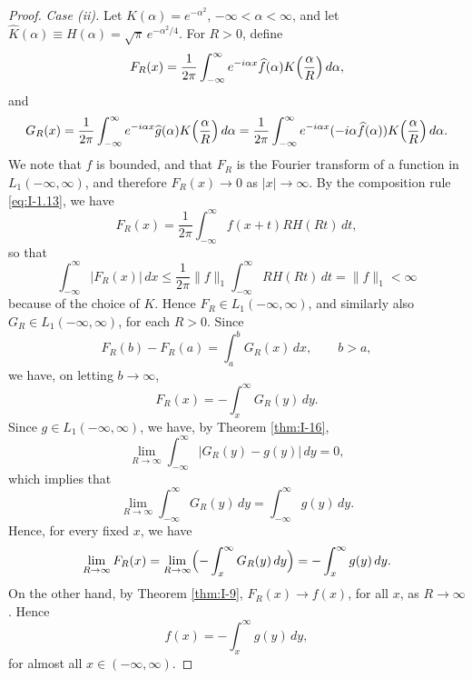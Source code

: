 \begin{proof}
\emph{Case (ii).} Let $K(\alpha)=e^{-\alpha^{2}}$, $-\infty<\alpha<\infty$, and let $\hat K(\alpha)\equiv H(\alpha)=\sqrt{\pi}\,e^{-\alpha^{2}/4}$. For $R>0$, define
\begin{equation*}
F_R(x)=\frac{1}{2\pi}\int_{-\infty}^{\infty}e^{-i\alpha x}\widehat f(\alpha)K\Bigl(\frac{\alpha}{R}\Bigr)\,d\alpha,
\end{equation*}
and
\begin{equation*}
G_R(x)=\frac{1}{2\pi}\int_{-\infty}^{\infty}e^{-i\alpha x}\widehat g(\alpha)K\Bigl(\frac{\alpha}{R}\Bigr)\,d\alpha
=\frac{1}{2\pi}\int_{-\infty}^{\infty}e^{-i\alpha x}(-i\alpha\widehat f(\alpha))K\Bigl(\frac{\alpha}{R}\Bigr)\,d\alpha.
\end{equation*}
We note that $\widehat f$ is bounded, and that $F_R$ is the Fourier transform of a function in $L_1(-\infty,\infty)$, and therefore $F_R(x)\to 0$ as $|x|\to\infty$. By the composition rule \eqref{eq:I-1.13}, we have
\begin{equation*}
F_R(x)=\frac{1}{2\pi}\int_{-\infty}^{\infty}f(x+t)RH(Rt)\,dt,
\end{equation*}
so that
\begin{equation}\label{eq:I-9.9}\tag{9.9}
\int_{-\infty}^{\infty}|F_R(x)|\,dx
\le\frac{1}{2\pi}\|f\|_1\int_{-\infty}^{\infty}RH(Rt)\,dt
=\|f\|_1<\infty
\end{equation}
because of the choice of $K$. Hence $F_R\in L_1(-\infty,\infty)$, and similarly also $G_R\in L_1(-\infty,\infty)$, for each $R>0$. Since
\begin{equation*}
F_R(b)-F_R(a)=\int_{a}^{b}G_R(x)\,dx,\qquad b>a,
\end{equation*}
we have, on letting $b\to\infty$,
\begin{equation*}
F_R(x)=-\int_{x}^{\infty}G_R(y)\,dy.
\end{equation*}
Since $g\in L_1(-\infty,\infty)$, we have, by Theorem \ref{thm:I-16},
\begin{equation*}
\lim_{R\to\infty}\int_{-\infty}^{\infty}|G_R(y)-g(y)|\,dy=0,
\end{equation*}
which implies that
\begin{equation*}
\lim_{R\to\infty}\int_{-\infty}^{\infty}G_R(y)\,dy=\int_{-\infty}^{\infty}g(y)\,dy.
\end{equation*}
Hence, for every fixed $x$, we have
\begin{equation*}
\lim_{R\to\infty}F_R(x)=\lim_{R\to\infty}\Bigl(-\int_{x}^{\infty}G_R(y)\,dy\Bigr)=-\int_{x}^{\infty}g(y)\,dy.
\end{equation*}
On the other hand, by Theorem \ref{thm:I-9}, $F_R(x)\to f(x)$, for all $x$, as $R\to\infty$. Hence
\begin{equation*}
f(x)=-\int_{x}^{\infty}g(y)\,dy,
\end{equation*}
for almost all $x\in(-\infty,\infty)$.
\end{proof}

